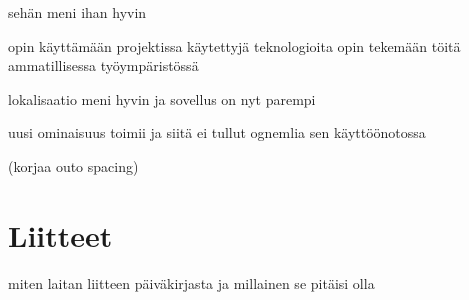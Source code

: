 \documentclass[11pt,a4paper,titlepage,oneside]{article}
\begin{document}
sehän meni ihan hyvin 

opin käyttämään projektissa käytettyjä teknologioita
opin tekemään töitä ammatillisessa työympäristössä
\medskip


lokalisaatio meni hyvin ja sovellus on nyt parempi
\medskip


uusi ominaisuus toimii ja siitä ei tullut ognemlia sen käyttöönotossa
\medskip





\newpage




(korjaa outo spacing)








\section{Liitteet}               %

miten laitan liitteen päiväkirjasta ja millainen se pitäisi olla
\end{document}
